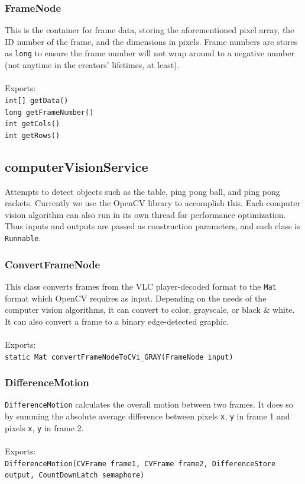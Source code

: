 \documentclass[11pt]{report}
\begin{document}
\subsubsection{FrameNode}

This is the container for frame data, storing the aforementioned pixel array, the ID number of the frame, and the dimensions in pixels.  Frame numbers are stores as \texttt{long} to ensure the frame number will not wrap around to a negative number (not anytime in the creators' lifetimes, at least).\\
\\
Exports:\\
\texttt{int[] getData()}\\
\texttt{long getFrameNumber()}\\
\texttt{int getCols()}\\
\texttt{int getRows()}

\subsection{computerVisionService}

Attempts to detect objects such as the table, ping pong ball, and ping pong rackets.  Currently we use the OpenCV library to accomplish this.  Each computer vision algorithm can also run in its own thread for performance optimization.  Thus inputs and outputs are passed as construction parameters, and each class is \texttt{Runnable}.

\subsubsection{ConvertFrameNode}

This class converts frames from the VLC player-decoded format to the \texttt{Mat} format which OpenCV requires as input.  Depending on the needs of the computer vision algorithms, it can convert to color, grayscale, or black \& white.  It can also convert a frame to a binary edge-detected graphic.\\
\\
Exports:\\
\texttt{static Mat convertFrameNodeToCVi\_GRAY(FrameNode input)}

\subsubsection{DifferenceMotion}

\texttt{DifferenceMotion} calculates the overall motion between two frames.  It does so by summing the absolute average difference between pixels \texttt{x}, \texttt{y} in frame 1 and pixels \texttt{x}, \texttt{y} in frame 2.\\
\\
Exports:\\
\texttt{DifferenceMotion(CVFrame frame1, CVFrame frame2, DifferenceStore output, CountDownLatch semaphore)}
\end{document}
